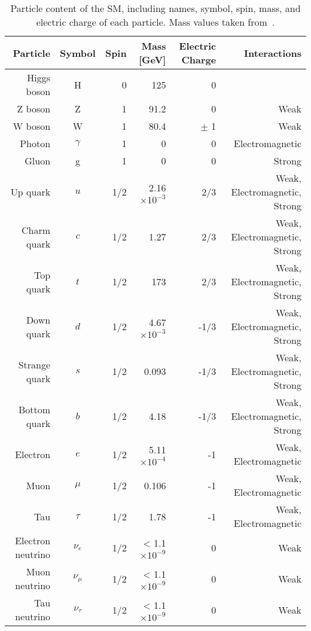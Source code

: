 \begin{table} [htbp!]
    \centering
    \begin{tabular}{ r c r r r r} \hline \hline
        Particle & Symbol & Spin & Mass [GeV] & Electric Charge & Interactions\\ \hline 
        Higgs boson & H & 0 & 125 & 0 & \\ \hline
        Z boson & Z & 1 & 91.2 & 0 & Weak \\ 
        W boson & W & 1 & 80.4 & $\pm$ 1 & Weak\\
        Photon & $\gamma$ & 1 & 0 & 0 & Electromagnetic\\
        Gluon & g & 1 & 0 & 0 & Strong \\ \hline
        Up quark & $u$ & 1/2 & 2.16 $\times 10^{-3}$ & 2/3 & Weak, Electromagnetic, Strong \\
        Charm quark & $c$ & 1/2 & 1.27 & 2/3 & Weak, Electromagnetic, Strong \\
        Top quark & $t$ & 1/2 & 173 & 2/3 & Weak, Electromagnetic, Strong \\
        Down quark & $d$ & 1/2 & 4.67 $\times 10^{-3}$ & -1/3 & Weak, Electromagnetic, Strong \\
        Strange quark & $s$ & 1/2 & 0.093 & -1/3 & Weak, Electromagnetic, Strong \\
        Bottom quark & $b$ & 1/2 & 4.18 & -1/3 & Weak, Electromagnetic, Strong \\ \hline
        Electron & $e$ & 1/2 & 5.11 $\times 10^{-4}$  & -1 & Weak, Electromagnetic \\
        Muon & $\mu$ & 1/2 & 0.106 & -1 & Weak, Electromagnetic\\
        Tau & $\tau$ & 1/2 & 1.78 & -1 & Weak, Electromagnetic\\
        Electron neutrino & $\nu_e$ & 1/2 & < 1.1 $\times 10^{-9}$ & 0 & Weak \\
        Muon neutrino & $\nu_\mu$ & 1/2 & < 1.1 $\times 10^{-9}$ & 0 & Weak \\
        Tau neutrino & $\nu_\tau$ & 1/2 & < 1.1 $\times 10^{-9}$ & 0 & Weak\\ \hline \hline
    \end{tabular}
    \caption{Particle content of the SM, including names, symbol, spin, mass, and electric charge of each particle. Mass values taken from~\cite{Zyla:2020zbs}.}
    \label{tab:sm_particles}
\end{table}

